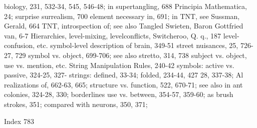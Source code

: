 biology, 231, 532-34, 545, 546-48; in           supertangling, 688
Principia Mathematica, 24; surprise             surrealism, 700
element necessary in, 691; in TNT, see          Sussman, Gerald, 664
TNT, introspection of; see also Tangled         Swieten, Baron Gottfried van, 6-7
Hierarchies, level-mixing, levelconflicts,      Switcheroo, Q. q., 187
level- confusion, etc.                          symbol-level description of brain, 349-51
street nuisances, 25, 726-27, 729               symbol vs. object, 699-706; see also
stretto, 314, 738                               subject vs. object, use vs. mention, etc.
String Manipulation Rules, 240-42               symbols: active vs. passive, 324-25, 327-
strings: defined, 33-34; folded, 234-44, 427    28, 337-38; Al realizations of, 662-63, 665;
structure vs. function, 522, 670-71; see also   in ant colonies, 324-28, 330; borderlines
use vs.                                         between, 354-57, 359-60; as brush strokes,
                                                351; compared with neurons, 350, 371;



Index                                                                                    783

